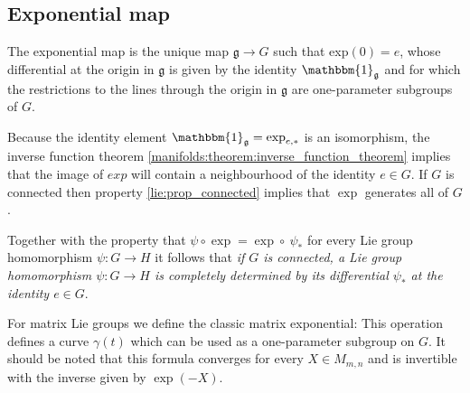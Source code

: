 \subsection{Exponential map}
	
	\begin{property}
		The exponential map is the unique map $\mathfrak{g}\rightarrow G$ such that exp$(0) = e$, whose differential at the origin in $\mathfrak{g}$ is given by the identity $\mathbbm{1}_\mathfrak{g}$ and for which the restrictions to the lines through the origin in $\mathfrak{g}$ are one-parameter subgroups of $G$.
	\end{property}
	\begin{result}
		Because the identity element $\mathbbm{1}_\mathfrak{g} = \exp_{e,\ast}$ is an isomorphism, the inverse function theorem \ref{manifolds:theorem:inverse_function_theorem} implies that the image of $exp$ will contain a neighbourhood of the identity $e\in G$. If $G$ is connected then property \ref{lie:prop_connected} implies that $\exp$ generates all of $G$.
		
		Together with the property that $\psi\circ\exp = \exp\circ\ \psi_\ast$ for every Lie group homomorphism $\psi:G\rightarrow H$ it follows that \textit{if $G$ is connected, a Lie group homomorphism $\psi:G\rightarrow H$ is completely determined by its differential $\psi_\ast$ at the identity $e\in G$}.
	\end{result}
	
	\begin{example}
		For matrix Lie groups we define the classic matrix exponential:
		This operation defines a curve $\gamma(t)$ which can be used as a one-parameter subgroup on $G$. It should be noted that this formula converges for every $X\in M_{m,n}$ and is invertible with the inverse given by $\exp(-X)$.
	\end{example}

